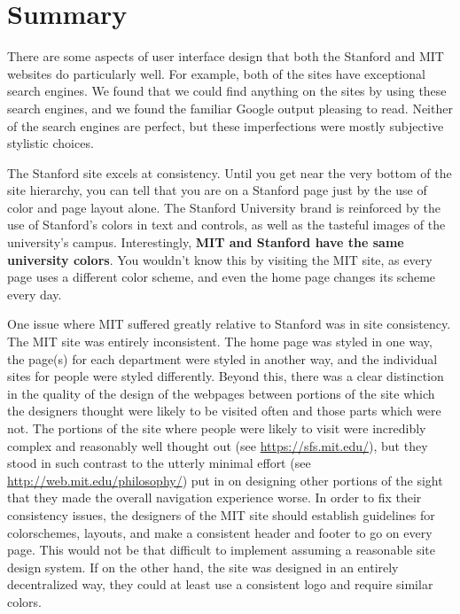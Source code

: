 \section*{Summary}

There are some aspects of user interface design that both the Stanford and MIT
websites do particularly well. For example, both of the sites have exceptional
search engines. We found that we could find anything on the sites by using
these search engines, and we found the familiar Google output pleasing to
read. Neither of the search engines are perfect, but these imperfections were
mostly subjective stylistic choices.

The Stanford site excels at consistency. Until you get near the very bottom of the
site hierarchy, you can tell that you are on a Stanford page just by the use of
color and page layout alone. The Stanford University brand is reinforced by the
use of Stanford's colors in text and controls, as well as the tasteful images
of the university's campus. Interestingly, \textbf{MIT and Stanford have the
same university colors}. You wouldn't know this by visiting the MIT site, as
every page uses a different color scheme, and even the home page changes its
scheme every day.

One issue where MIT suffered greatly relative to Stanford was in site consistency. The MIT site was entirely inconsistent. The
home page was styled in one way, the page(s) for each department were styled in another way, and the individual sites for people
were styled differently. Beyond this, there was a clear distinction in the quality of the design of the webpages between portions
of the site which the designers thought were likely to be visited often and those parts which were not. The portions of the site
where people were likely to visit were incredibly complex and reasonably well thought out (see \url{https://sfs.mit.edu/}),
but they stood in such contrast to the utterly minimal effort (see \url{http://web.mit.edu/philosophy/}) put in on designing other portions of the sight that they made the overall navigation experience worse. In order to fix their consistency
issues, the designers of the MIT site should establish guidelines for colorschemes, layouts, and make a consistent header and
footer to go on every page. This would not be that difficult to implement assuming a reasonable site design system. If on the other
hand, the site was designed in an entirely decentralized way, they could at least use a consistent logo and require similar colors.

